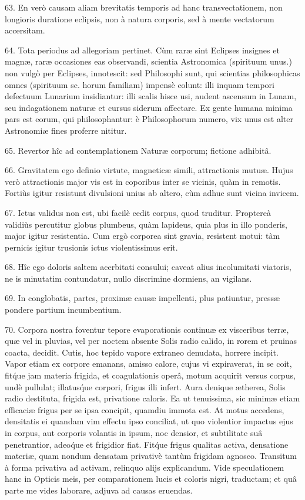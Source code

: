 \documentclass[a4paper, 11pt, oneside, polutonikogreek, german]{article}
\begin{document}
63. En verò causam aliam brevitatis temporis ad hanc transvectationem, non longioris duratione eclipsis, non à natura corporis, sed à mente vectatorum accersitam.

64. Tota periodus ad allegoriam pertinet. Cùm raræ sint Eclipses insignes et magnæ, raræ occasiones eas observandi, scientia Astronomica (spirituum unus.) non vulgò per Eclipses, innotescit: sed Philosophi sunt, qui scientias philosophicas omnes (spirituum sc. horum familiam) impensè colunt: illi inquam tempori defectuum Lunarium insidiantur: illi scalis hisce usi, audent ascensum in Lunam, seu indagationem naturæ et cursus siderum affectare. Ex gente humana minima pars est eorum, qui philosophantur: è Philosophorum numero, vix unus est alter Astronomiæ fines proferre nititur.

65. Revertor hîc ad contemplationem Naturæ corporum; fictione adhibitâ.

66. Gravitatem ego definio virtute, magneticæ simili, attractionis mutuæ. Hujus verò attractionis major vis est in coporibus inter se vicinis, quàm in remotis. Fortiùs igitur resistunt divulsioni unius ab altero, cùm adhuc sunt vicina invicem.

67. Ictus validus non est, ubi facilè cedit corpus, quod truditur. Proptereà validiùs percutitur globus plumbeus, quàm lapideus, quia plus in illo ponderis, major igitur resistentia. Cum ergò corporea sint gravia, resistent motui: tàm pernicis igitur trusionis ictus violentissimus erit.

68. Hîc ego doloris saltem acerbitati consului; caveat alius incolumitati viatoris, ne is minutatim contundatur, nullo discrimine dormiens, an vigilans.

69. In conglobatis, partes, proximæ causæ impellenti, plus patiuntur, pressæ pondere partium incumbentium.

70. Corpora nostra foventur tepore evaporationis continuæ ex visceribus terræ, quæ vel in pluvias, vel per noctem absente Solis radio calido, in rorem et pruinas coacta, decidit. Cutis, hoc tepido vapore extraneo denudata, horrere incipit. Vapor etiam ex corpore emanans, amisso calore, cujus vi expiraverat, in se coit, fit\'que jam materia frigida, et coagulationis operâ, motum acquirit versus corpus, undè pullulat; illatus\'que corpori, frigus illi infert. Aura denique ætherea, Solis radio destituta, frigida est, privatione caloris. Ea ut tenuissima, sic minimæ etiam efficaciæ frigus per se ipsa concipit, quamdiu immota est. At motus accedens, densitatis ei quandam vim effectu ipso conciliat, ut quo violentior impactus ejus in corpus, aut corporis volantis in ipsum, noc densior, et subtilitate suâ penetrantior, adeo\'que et frigidior fiat. Fit\'que frigus qualitas activa, densatione materiæ, quam nondum densatam privativè tantùm frigidam agnosco. Transitum à forma privativa ad activam, relinquo alijs explicandum. Vide speculationem hanc in Opticis meis, per comparationem lucis et coloris nigri, traductam; et quâ parte me vides laborare, adjuva ad causas eruendas.
\end{document}
